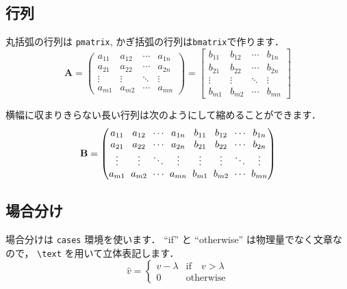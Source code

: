 \documentclass[dvipdfmx,disablejfam,nosetpagesize,12pt]{jsbook}
\begin{document}
\subsection{行列}
丸括弧の行列は \verb+pmatrix+, かぎ括弧の行列は\verb+bmatrix+で作ります．
\begin{equation}
   \mathbf{A} = 
   \begin{pmatrix}
      a_{11} & a_{12} & \cdots & a_{1n} \\
      a_{21} & a_{22} & \cdots & a_{2n} \\
      \vdots & \vdots & \ddots & \vdots \\
      a_{m1} & a_{m2} & \cdots & a_{mn}
   \end{pmatrix} =
   \begin{bmatrix}
      b_{11} & b_{12} & \cdots & b_{1n} \\
      b_{21} & b_{22} & \cdots & b_{2n} \\
      \vdots & \vdots & \ddots & \vdots \\
      b_{m1} & b_{m2} & \cdots & b_{mn}
   \end{bmatrix}
   \label{eq:pmatrix and bmatrix}
\end{equation}

横幅に収まりきらない長い行列は次のようにして縮めることができます．
\begin{equation}
   \setlength{\arraycolsep}{3pt}
   \mathbf{B} = 
   \begin{pmatrix}
      a_{11} & a_{12} & \cdots & a_{1n} & b_{11} & b_{12} & \cdots & b_{1n} \\
      a_{21} & a_{22} & \cdots & a_{2n} & b_{21} & b_{22} & \cdots & b_{2n} \\
      \vdots & \vdots & \ddots & \vdots & \vdots & \vdots & \ddots & \vdots \\
      a_{m1} & a_{m2} & \cdots & a_{mn} & b_{m1} & b_{m2} & \cdots & b_{mn}
   \end{pmatrix}
   \label{eq:matrix with narrow column spacing}
\end{equation}

\subsection{場合分け}
場合分けは \verb+cases+ 環境を使います． 
``if'' と ``otherwise'' は物理量でなく文章なので， \verb+\text+ を用いて立体表記します．
\begin{equation}
   \hat{v} = 
   \begin{cases}
      v - \lambda  & \text{if} \quad v > \lambda \\
      0            & \text{otherwise}
   \end{cases}
   \label{eq:cases environment}
\end{equation}
\end{document}

